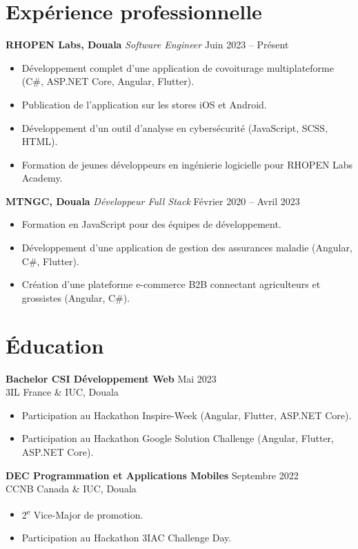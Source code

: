 \documentclass[a4paper,10pt]{article}
\begin{document}
\section*{Expérience professionnelle}
\textbf{RHOPEN Labs, Douala} \hfill \textit{Software Engineer} \hfill Juin 2023 -- Présent\\
\begin{itemize}[leftmargin=0.3cm]
    \item Développement complet d'une application de covoiturage multiplateforme (C\#, ASP.NET Core, Angular, Flutter).
    \item Publication de l'application sur les stores iOS et Android.
    \item Développement d'un outil d'analyse en cybersécurité (JavaScript, SCSS, HTML).
    \item Formation de jeunes développeurs en ingénierie logicielle pour RHOPEN Labs Academy.
\end{itemize}

\textbf{MTNGC, Douala} \hfill \textit{Développeur Full Stack} \hfill Février 2020 -- Avril 2023\\
\begin{itemize}[leftmargin=0.3cm]
    \item Formation en JavaScript pour des équipes de développement.
    \item Développement d'une application de gestion des assurances maladie (Angular, C\#, Flutter).
    \item Création d'une plateforme e-commerce B2B connectant agriculteurs et grossistes (Angular, C\#).
\end{itemize}

\section*{Éducation}
\textbf{Bachelor CSI Développement Web} \hfill Mai 2023\\
3IL France \& IUC, Douala\\
\begin{itemize}[leftmargin=0.3cm]
    \item Participation au Hackathon Inspire-Week (Angular, Flutter, ASP.NET Core).
    \item Participation au Hackathon Google Solution Challenge (Angular, Flutter, ASP.NET Core).
\end{itemize}

\textbf{DEC Programmation et Applications Mobiles} \hfill Septembre 2022\\
CCNB Canada \& IUC, Douala\\
\begin{itemize}[leftmargin=0.3cm]
    \item 2\textsuperscript{e} Vice-Major de promotion.
    \item Participation au Hackathon 3IAC Challenge Day.
\end{itemize}
\end{document}
